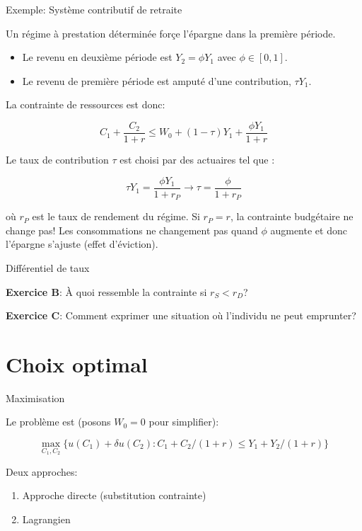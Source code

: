 \documentclass[handout]{beamer}
\begin{document}
\begin{frame}{Exemple: Système contributif de retraite}

Un régime à prestation déterminée forçe l'épargne dans la première période. 
\begin{itemize}

\item Le revenu en deuxième période est $Y_2 = \phi Y_1$ avec $\phi \in [0,1]$. 
\item Le revenu de première période est amputé d'une contribution, $\tau Y_1$. 

\end{itemize}

La contrainte de ressources est donc: 

$$ C_1 + \frac{C_2}{1+r} \leq W_0 + (1-\tau)Y_1 + \frac{\phi Y_1}{1+r}  $$

Le taux de contribution $\tau$ est choisi par des actuaires tel que : 

$$ \tau Y_1 = \frac{\phi Y_1}{1+r_P} \to \tau = \frac{\phi}{1+r_P} $$

où $r_P$ est le taux de rendement du régime. Si $r_P = r$, la contrainte budgétaire ne change pas! Les consommations ne changement pas quand $\phi$ augmente et donc l'épargne s'ajuste (effet d'éviction).

\end{frame}

\begin{frame}{Différentiel de taux}

\textbf{Exercice B}: À quoi ressemble la contrainte si $r_S<r_D$?

\textbf{Exercice C}: Comment exprimer une situation où l'individu ne peut emprunter?

\end{frame}

\section{Choix optimal}

\begin{frame}{Maximisation}

Le problème est (posons $W_0=0$ pour simplifier):

$$ \max_{C_1,C_2} \{ u(C_1) + \delta u(C_2) : C_1+C_2/(1+r) \leq Y_1 + Y_2/(1+r)\}  $$

Deux approches: 
\begin{enumerate}
\item Approche directe (substitution contrainte)
\item Lagrangien	
\end{enumerate}


\end{frame}
\end{document}
